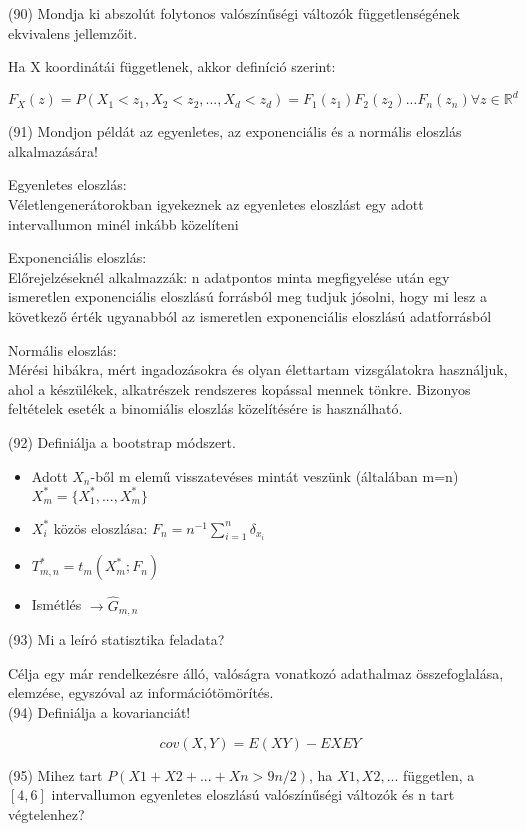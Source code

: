 \documentclass[12p]{article}
\begin{document}
(90) Mondja ki abszolút folytonos valószínűségi változók függetlenségének ekvivalens jellemzőit.

Ha X koordinátái függetlenek, akkor definíció szerint:

$F_X(z) = P(X_1<z_1, X_2<z_2, ..., X_d<z_d) = F_1(z_1)F_2(z_2)...F_n(z_n) \forall z \in \mathbb{R}^d$

(91) Mondjon példát az egyenletes, az exponenciális és a normális eloszlás alkalmazására!

Egyenletes eloszlás:\\
Véletlengenerátorokban igyekeznek az egyenletes eloszlást egy adott intervallumon minél inkább közelíteni

Exponenciális eloszlás:\\
Előrejelzéseknél alkalmazzák: n adatpontos minta megfigyelése után egy ismeretlen exponenciális eloszlású forrásból meg tudjuk jósolni, hogy mi lesz a következő érték ugyanabból az ismeretlen exponenciális eloszlású adatforrásból

Normális eloszlás:\\
Mérési hibákra, mért ingadozásokra és olyan élettartam vizsgálatokra használjuk, ahol a készülékek, alkatrészek rendszeres kopással mennek tönkre. Bizonyos feltételek eseték a binomiális eloszlás közelítésére is használható.

(92) Definiálja a bootstrap módszert.

\begin{itemize}
	\item Adott $X_n$-ből m elemű visszatevéses mintát veszünk (általában m=n) \quad $X^{*}_m = \{X^{*}_1,...,X^{*}_m\}$
	\item $X_i^{*}$ közös eloszlása: $F_n = n^{-1} \sum^n_{i=1} \delta_{x_i}$
	\item $T^{*}_{m,n} = t_m (X^{*}_m;F_n)$
	\item Ismétlés $\rightarrow \hat{G}_{m,n}$
	
\end{itemize}


(93) Mi a leíró statisztika feladata?

Célja egy már rendelkezésre álló, valóságra vonatkozó adathalmaz összefoglalása, elemzése, egyszóval az információtömörítés.\\

(94) Definiálja a kovarianciát!

$$cov(X, Y) = E(XY) - EXEY$$

(95) Mihez tart $P(X1+X2+ ... +Xn > 9n/2)$, ha $X1, X2, . . .$ független, a $[4,6]$ intervallumon
egyenletes eloszlású valószínűségi változók és n tart végtelenhez?
\end{document}
